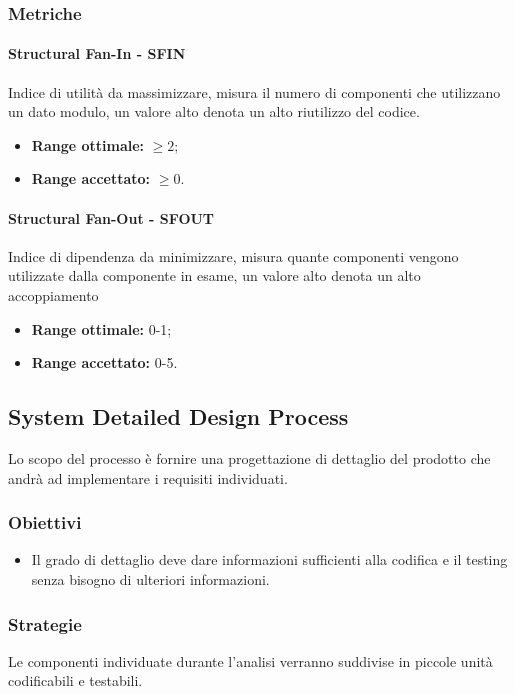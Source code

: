 		\subsubsection{Metriche}
			\paragraph{Structural Fan-In - SFIN} \Spazio
			Indice di utilità da massimizzare, misura il numero di componenti che utilizzano un dato modulo, un valore alto denota un alto riutilizzo del codice.
			\begin{itemize}
				\item \textbf{Range ottimale:} $\geq 2$;
				\item \textbf{Range accettato:} $\geq 0$.
			\end{itemize}
			\paragraph{Structural Fan-Out - SFOUT} \Spazio
			Indice di dipendenza da minimizzare, misura quante componenti vengono utilizzate dalla componente in esame, un valore alto denota un alto accoppiamento
			\begin{itemize}
				\item \textbf{Range ottimale:} 0-1;
				\item \textbf{Range accettato:} 0-5.
			\end{itemize}
            

\subsection{System Detailed Design Process}
Lo scopo del processo è fornire una progettazione di dettaglio del prodotto che andrà ad implementare i requisiti individuati.
		\subsubsection{Obiettivi}
		\begin{itemize}
			\item Il grado di dettaglio deve dare informazioni sufficienti alla codifica e il testing senza bisogno di ulteriori informazioni.
		\end{itemize}
		\subsubsection{Strategie}
		Le componenti individuate durante l'analisi verranno suddivise in piccole unità codificabili e testabili.
